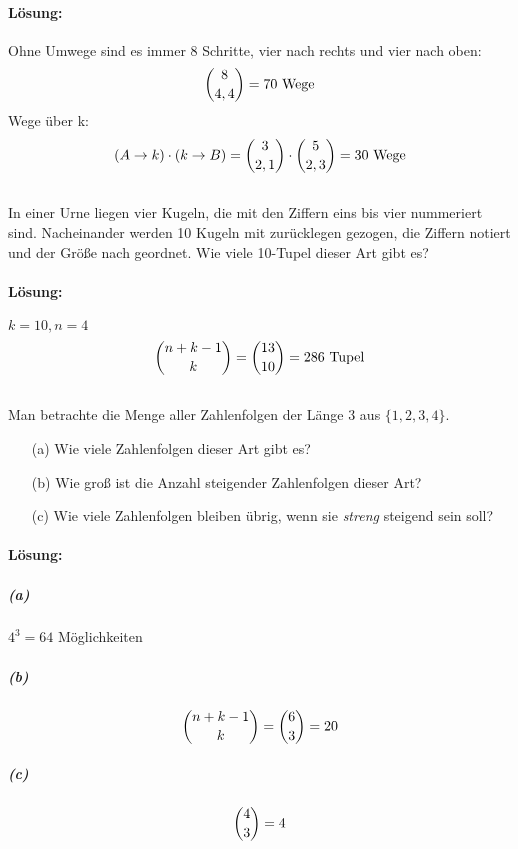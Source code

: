 \documentclass[ngerman]{scrartcl}
\begin{document}
\paragraph{Lösung:}
Ohne Umwege sind es immer 8 Schritte, vier nach rechts und vier nach oben:
\begin{equation*}
\dbinom{8}{4,4} = 70\text{ Wege}
\end{equation*}
Wege über k:
\begin{equation*}
(A\rightarrow k)\cdot (k\rightarrow B) = \dbinom{3}{2,1}\cdot\dbinom{5}{2,3} = 30 \text{ Wege}
\end{equation*}
\subsection{}

In einer Urne liegen vier Kugeln, die mit den Ziffern eins bis vier nummeriert sind. Nacheinander werden 10 Kugeln mit zurücklegen gezogen, die Ziffern notiert und der Größe nach geordnet. Wie viele 10-Tupel dieser Art gibt es?
\paragraph{Lösung:}
$k=10, n=4$
\begin{equation*}
\dbinom{n+k-1}{k} = \dbinom{13}{10} = 286 \text{ Tupel}
\end{equation*}
\subsection{}

Man betrachte die Menge aller Zahlenfolgen der Länge 3 aus $\lbrace 1, 2, 3, 4 \rbrace$.

\begin{enumerate}
\item[(a)] Wie viele Zahlenfolgen dieser Art gibt es?
\item[(b)] Wie groß ist die Anzahl steigender Zahlenfolgen dieser Art?
\item[(c)] Wie viele Zahlenfolgen bleiben übrig, wenn sie \textit{streng} steigend sein soll?
\end{enumerate}
\paragraph{Lösung:}
\subparagraph{(a)} \begin{center}
$4^{3} = 64$ Möglichkeiten
\end{center}
\subparagraph{(b)} \[\dbinom{n+k-1}{k} = \dbinom{6}{3} = 20\]
\subparagraph{(c)} \[\dbinom{4}{3} = 4\]
\end{document}
